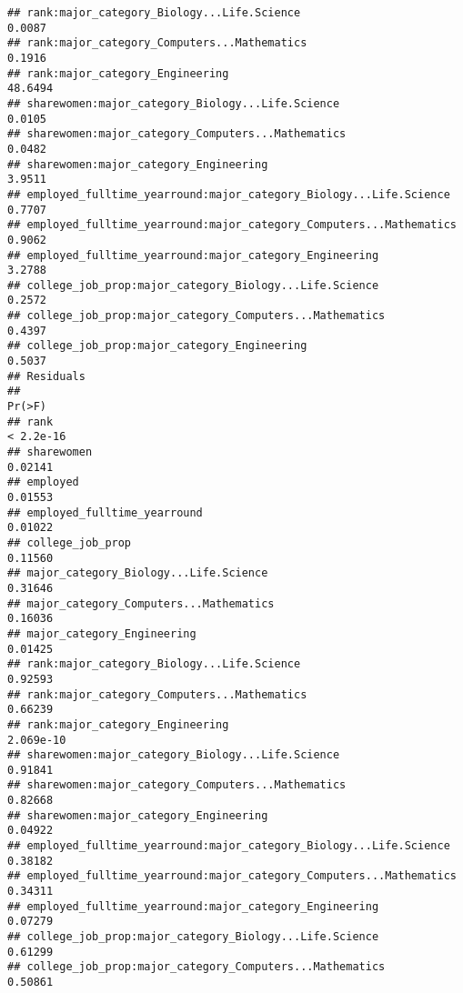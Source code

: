 \documentclass[
]{article}
\begin{document}
\begin{verbatim}
## rank:major_category_Biology...Life.Science                            0.0087
## rank:major_category_Computers...Mathematics                           0.1916
## rank:major_category_Engineering                                      48.6494
## sharewomen:major_category_Biology...Life.Science                      0.0105
## sharewomen:major_category_Computers...Mathematics                     0.0482
## sharewomen:major_category_Engineering                                 3.9511
## employed_fulltime_yearround:major_category_Biology...Life.Science     0.7707
## employed_fulltime_yearround:major_category_Computers...Mathematics    0.9062
## employed_fulltime_yearround:major_category_Engineering                3.2788
## college_job_prop:major_category_Biology...Life.Science                0.2572
## college_job_prop:major_category_Computers...Mathematics               0.4397
## college_job_prop:major_category_Engineering                           0.5037
## Residuals                                                                   
##                                                                       Pr(>F)
## rank                                                               < 2.2e-16
## sharewomen                                                           0.02141
## employed                                                             0.01553
## employed_fulltime_yearround                                          0.01022
## college_job_prop                                                     0.11560
## major_category_Biology...Life.Science                                0.31646
## major_category_Computers...Mathematics                               0.16036
## major_category_Engineering                                           0.01425
## rank:major_category_Biology...Life.Science                           0.92593
## rank:major_category_Computers...Mathematics                          0.66239
## rank:major_category_Engineering                                    2.069e-10
## sharewomen:major_category_Biology...Life.Science                     0.91841
## sharewomen:major_category_Computers...Mathematics                    0.82668
## sharewomen:major_category_Engineering                                0.04922
## employed_fulltime_yearround:major_category_Biology...Life.Science    0.38182
## employed_fulltime_yearround:major_category_Computers...Mathematics   0.34311
## employed_fulltime_yearround:major_category_Engineering               0.07279
## college_job_prop:major_category_Biology...Life.Science               0.61299
## college_job_prop:major_category_Computers...Mathematics              0.50861

\end{verbatim}
\end{document}

